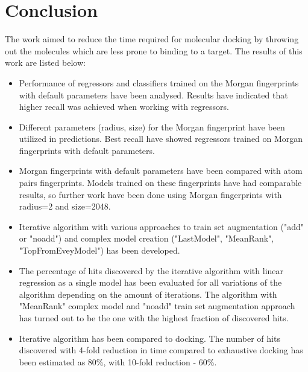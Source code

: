 \chapter{Conclusion}

The work aimed to reduce the time required for molecular docking by throwing out the molecules which are less prone to binding to a target. The results of this work are listed below:

\begin{itemize}
    \item Performance of regressors and classifiers trained on the Morgan fingerprints with default parameters have been analysed.
    Results have indicated that higher recall was achieved when working with regressors.
    \item Different parameters (radius, size) for the Morgan fingerprint have been utilized in predictions.
    Best recall have showed regressors trained on Morgan fingerprints with default parameters.
    \item Morgan fingerprints with default parameters have been compared with atom pairs fingerprints.
    Models trained on these fingerprints have had comparable results, so further work have been done using Morgan fingerprints with radius=2 and size=2048.
    \item Iterative algorithm with various approaches to train set augmentation ("add" or "noadd") and complex model creation ("LastModel", "MeanRank", "TopFromEveyModel") has been developed.
    \item The percentage of hits discovered by the iterative algorithm with linear regression as a single model has been evaluated for all variations of the algorithm depending on the amount of iterations.
    The algorithm with "MeanRank" complex model and "noadd" train set augmentation approach has turned out to be the one with the highest fraction of discovered hits.
    \item Iterative algorithm has been compared to docking.
    The number of hits discovered with 4-fold reduction in time compared to exhaustive docking has been estimated as 80\%, with 10-fold reduction - 60\%.
\end{itemize}
